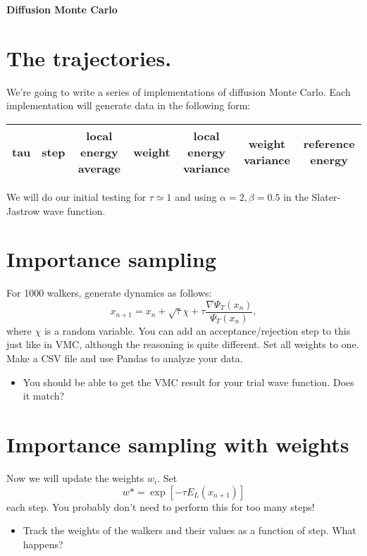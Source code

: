 \documentclass[12pt]{article}
\begin{document}
	{\bf Diffusion Monte Carlo } 

\section*{The trajectories.} 

We're going to write a series of implementations of diffusion Monte Carlo.
Each implementation will generate data in the following form: 

\begin{tabular}{ccccccc}
tau&step&local energy average&weight&local energy variance &weight variance&reference energy\\
\hline
\end{tabular}

We will do our initial testing for $\tau\simeq 1$ and using $\alpha=2,\beta=0.5$ in the Slater-Jastrow wave function.
	
\section{Importance sampling} 

For 1000 walkers, generate dynamics as follows: 
\begin{equation}
x_{n+1} = x_n + \sqrt{\tau}\chi + \tau \frac{\nabla \Psi_T(x_n)}{\Psi_T(x_n)},
\end{equation}
where $\chi$ is a random variable. 
You can add an acceptance/rejection step to this just like in VMC, although the reasoning is quite different.
Set all weights to one.
Make a CSV file and use Pandas to analyze your data. 


\begin{itemize}
\item You should be able to get the VMC result for your trial wave function. Does it match? 
\end{itemize}

\section{Importance sampling with weights}
Now we will update the weights $w_i$. Set 
\begin{equation}
w*=	\exp[-\tau E_L(x_{n+1})] 
\end{equation}
each step.
You probably don't need to perform this for too many steps!

\begin{itemize}
\item Track the weights of the walkers and their values as a function of step. What happens?
\end{itemize}
\end{document}
